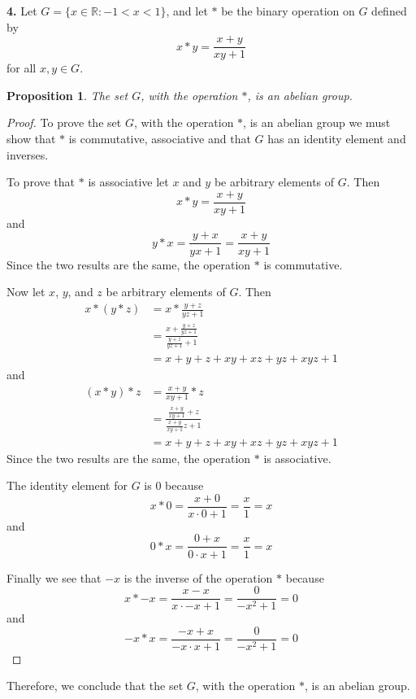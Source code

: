 \documentclass[12pt]{article}   %
\newtheorem*{proposition}{Proposition}  %
\begin{document}
\noindent\textbf{4.} \quad Let $G = \{x \in \mathbb{R}: -1 < x < 1\}$, and let $\ast$ be the binary operation on $G$ defined by
\begin{equation}
x * y = \frac{x + y}{xy + 1}
\end{equation}
for all $x, y \in G$.

\begin{proposition}
The set $G$, with the operation $\ast$, is an abelian group.
\end{proposition}

\begin{proof}
To prove the set $G$, with the operation $\ast$, is an abelian group we must show that $\ast$ is commutative, associative and that $G$ has an identity element and inverses.

To prove that $*$ is associative let $x$ and $y$ be arbitrary elements of $G$. Then
\begin{equation*}
x * y = \frac{x + y}{xy + 1}
\end{equation*}
and
\begin{equation*}
y * x = \frac{y + x}{yx + 1} = \frac{x + y}{xy + 1}
\end{equation*}
Since the two results are the same, the operation $\ast$ is commutative.

Now let $x$, $y$, and $z$ be arbitrary elements of $G$. Then
\begin{align*}
x * (y * z) &= x * \frac{y + z}{yz + 1} \\
&= \frac{x + \frac{y + z}{yz + 1}}{\frac{y + z}{yz + 1} + 1} \\
&= x + y + z + xy + xz + yz + xyz + 1
\end{align*}
and
\begin{align*}
(x * y) * z &= \frac{x + y}{xy + 1} *z \\
&= \frac{\frac{x + y }{xy + 1} + z}{\frac{x + y}{xy + 1}z + 1} \\
&= x + y + z + xy + xz + yz + xyz + 1
\end{align*}
Since the two results are the same, the operation $*$ is associative.

The identity element for $G$ is $0$ because
\begin{equation*}
x * 0 = \frac{x + 0}{x \cdot 0 + 1} = \frac{x}{1} = x
\end{equation*}
and
\begin{equation*}
0 * x = \frac{0 + x}{0 \cdot x + 1} = \frac{x}{1} = x
\end{equation*}

Finally we see that $-x$ is the inverse of the operation $\ast$ because
\begin{equation*}
x * -x = \frac{x - x}{x \cdot -x + 1} = \frac{0}{-x^2 + 1} = 0
\end{equation*}
and
\begin{equation*}
-x * x = \frac{-x + x}{-x \cdot x + 1} = \frac{0}{-x^2 + 1} = 0
\end{equation*}

\end{proof}
Therefore, we conclude that the set $G$, with the operation $\ast$, is an abelian group.
\end{document}
